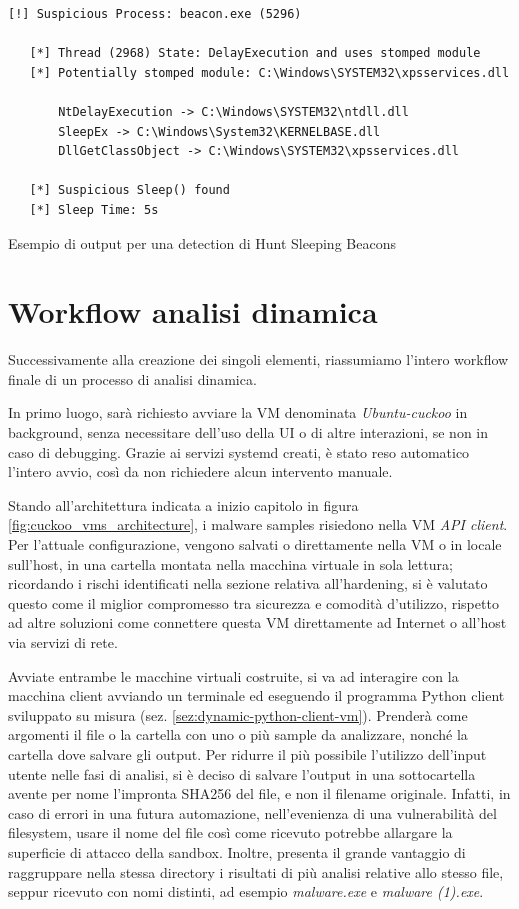 \begin{code}
\begin{verbatim}
[!] Suspicious Process: beacon.exe (5296)

   [*] Thread (2968) State: DelayExecution and uses stomped module
   [*] Potentially stomped module: C:\Windows\SYSTEM32\xpsservices.dll

       NtDelayExecution -> C:\Windows\SYSTEM32\ntdll.dll
       SleepEx -> C:\Windows\System32\KERNELBASE.dll
       DllGetClassObject -> C:\Windows\SYSTEM32\xpsservices.dll

   [*] Suspicious Sleep() found
   [*] Sleep Time: 5s
\end{verbatim}
\label{lst:hunt-sleeping-beacons-example-text}
\caption{Esempio di output per una detection di Hunt Sleeping Beacons}
\end{code}

\section{Workflow analisi dinamica}
Successivamente alla creazione dei singoli elementi, riassumiamo l'intero workflow finale di un processo di analisi dinamica.

In primo luogo, sarà richiesto avviare la VM denominata \emph{Ubuntu-cuckoo} in background, senza necessitare dell'uso della UI o di altre interazioni, se non in caso di debugging. Grazie ai servizi systemd creati, è stato reso automatico l'intero avvio, così da non richiedere alcun intervento manuale.

Stando all'architettura indicata a inizio capitolo in figura \ref{fig:cuckoo_vms_architecture}, i malware samples risiedono nella VM \emph{API client}. Per l'attuale configurazione, vengono salvati o direttamente nella VM o in locale sull'host, in una cartella montata nella macchina virtuale in sola lettura; ricordando i rischi identificati nella sezione relativa all'hardening, si è valutato questo come il miglior compromesso tra sicurezza e comodità d'utilizzo, rispetto ad altre soluzioni come connettere questa VM direttamente ad Internet o all'host via servizi di rete.

Avviate entrambe le macchine virtuali costruite, si va ad interagire con la macchina client avviando un terminale ed eseguendo il programma Python client sviluppato su misura (sez. \ref{sez:dynamic-python-client-vm}).
Prenderà come argomenti il file o la cartella con uno o più sample da analizzare, nonché la cartella dove salvare gli output.
Per ridurre il più possibile l'utilizzo dell'input utente nelle fasi di analisi, si è deciso di salvare l'output in una sottocartella avente per nome l'impronta SHA256 del file, e non il filename originale.
Infatti, in caso di errori in una futura automazione, nell'evenienza di una vulnerabilità del filesystem, usare il nome del file così come ricevuto potrebbe allargare la superficie di attacco della sandbox.
Inoltre, presenta il grande vantaggio di raggruppare nella stessa directory i risultati di più analisi relative allo stesso file, seppur ricevuto con nomi distinti, ad esempio \emph{malware.exe} e \emph{malware (1).exe}.

